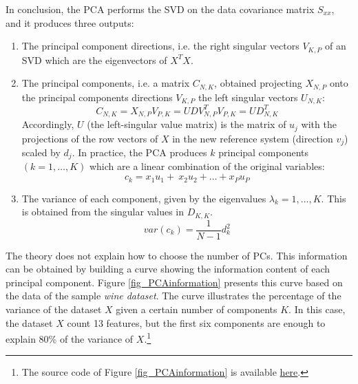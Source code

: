In conclusion, the PCA performs the SVD on the data covariance matrix $S_{xx}$, and it produces three outputs:
\begin{enumerate}
    \item The principal component directions, i.e. the right singular vectors $V_{K,P}$ of an SVD which are the eigenvectors of $X^TX$.
    \item The principal components, i.e. a matrix $C_{N,K}$, obtained projecting $X_{N,P}$ onto the principal components directions $V_{K,P}$ the left singular vectors $U_{N,K}$:
        \begin{equation}
        C_{N,K}=X_{N,P}V_{P,K}=UDV_{N,P}^TV_{P,K}=UD_{N,K}^T
        \label{eq_PCA9}
        \end{equation}
    Accordingly, $U$ (the left-singular value matrix) is the matrix of $u_j$ with the projections of the row vectors of $X$ in the new reference system (direction $v_j$) scaled by $d_j$. In practice, the PCA produces $k$ principal components $(k=1,\ldots,K)$ which are a linear combination of the original variables:
        \begin{equation}
        c_k=x_1u_1+\ x_2u_2+\ldots+x_Pu_P
        \label{eq_PCA10}
        \end{equation}
    \item The variance of each component, given by the eigenvalues $\lambda_k=1,\ldots,K$. This is obtained from the singular values in $D_{K,K}$.
        \begin{equation}
        var\left(c_k\right)=\frac{1}{N-1}d_k^2
        \label{eq_PCA11}
        \end{equation}
\end{enumerate}
	
	
The theory does not explain how to choose the number of PCs. This information can be obtained by building a curve showing the information content of each principal component. Figure \ref{fig_PCAinformation} presents this curve based on the data of the sample \textit{wine dataset}. The curve illustrates the percentage of the variance of the dataset $X$ given a certain number of components $K$. In this case, the dataset $X$ count 13 features, but the first six components are enough to explain 80\% of the variance of $X$.\footnote{The source code of Figure \ref{fig_PCAinformation} is available \href{https://github.com/aletuf93/logproj/blob/master/examples/05.\%20Dimensionality\%20Reduction.ipynb}{here}.
}	

